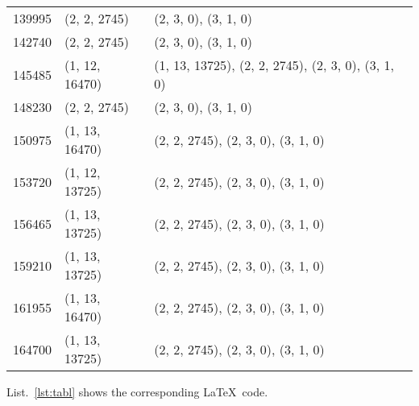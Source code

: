 \begin{center}
{\begin{tabularx}{\textwidth}{p{}|p{}|p{}}
139995 & (2, 2, 2745) & (2, 3, 0), (3, 1, 0) \\
142740 & (2, 2, 2745) & (2, 3, 0), (3, 1, 0) \\
145485 & (1, 12, 16470) & (1, 13, 13725), (2, 2, 2745), (2, 3, 0), (3, 1, 0) \\
148230 & (2, 2, 2745) & (2, 3, 0), (3, 1, 0) \\
150975 & (1, 13, 16470) & (2, 2, 2745), (2, 3, 0), (3, 1, 0) \\
153720 & (1, 12, 13725) & (2, 2, 2745), (2, 3, 0), (3, 1, 0) \\
156465 & (1, 13, 13725) & (2, 2, 2745), (2, 3, 0), (3, 1, 0) \\
159210 & (1, 13, 13725) & (2, 2, 2745), (2, 3, 0), (3, 1, 0) \\
161955 & (1, 13, 16470) & (2, 2, 2745), (2, 3, 0), (3, 1, 0) \\
164700 & (1, 13, 13725) & (2, 2, 2745), (2, 3, 0), (3, 1, 0) \\
\end{tabularx}
}
\end{center}
\cleardoublepage









List.~\ref{lst:tabl} shows the corresponding \LaTeX \ code. 

